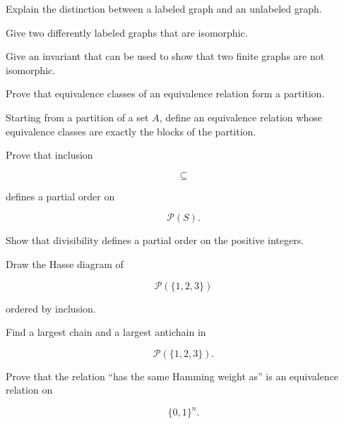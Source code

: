\begin{exercise}[2]
Explain the distinction between a labeled graph and an unlabeled graph.
\end{exercise}

\begin{exercise}[2]
Give two differently labeled graphs that are isomorphic.
\end{exercise}

\begin{exercise}[2]
Give an invariant that can be used to show that two finite graphs are
not isomorphic.
\end{exercise}

\begin{exercise}[3]
Prove that equivalence classes of an equivalence relation form a
partition.
\end{exercise}

\begin{exercise}[3]
Starting from a partition of a set \(A\), define an equivalence relation
whose equivalence classes are exactly the blocks of the partition.
\end{exercise}

\begin{exercise}[3]
Prove that inclusion

\[
\subseteq
\]

defines a partial order on

\[
\mathcal{P}(S).
\]
\end{exercise}

\begin{exercise}[3]
Show that divisibility defines a partial order on the positive integers.
\end{exercise}

\begin{exercise}[3]
Draw the Hasse diagram of

\[
\mathcal{P}(\{1,2,3\})
\]

ordered by inclusion.
\end{exercise}

\begin{exercise}[3]
Find a largest chain and a largest antichain in

\[
\mathcal{P}(\{1,2,3\}).
\]
\end{exercise}

\begin{exercise}[3]
Prove that the relation ``has the same Hamming weight as'' is an
equivalence relation on

\[
\{0,1\}^n.
\]
\end{exercise}

